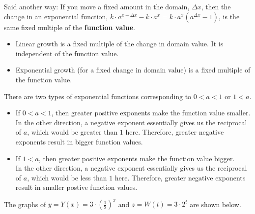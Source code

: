\documentclass{ximera}
\begin{document}
Said another way:  If you move a fixed amount in the domain, $\Delta x$, then the change in an exponential function, $k \cdot a^{x + \Delta x} - k \cdot a^x = k \cdot a^x (a^{\Delta x} - 1)$, is the same fixed multiple of the \textbf{function value}.

\begin{itemize}
\item Linear growth is a fixed multiple of the change in domain value. It is independent of the function value.
\item Exponential growth (for a fixed change in domain value) is a fixed multiple of the function value. 
\end{itemize}





There are two types of exponential functions corresponding to $0<a<1$ or $1<a$.






\begin{itemize}
\item If $0<a<1$, then greater positive exponents make the function value smaller.   \\
In the other direction, a negative exponent essentially gives us the reciprocal of $a$, which would be greater than $1$ here.  Therefore, greater negative exponents result in bigger function values. \\

\item If $1<a$, then greater positive exponents make the function value bigger.   \\ 
In the other direction, a negative exponent essentially gives us the reciprocal of $a$, which would be less than $1$ here.  Therefore, greater negative exponents result in smaller postive function values.
\end{itemize}



The graphs of $y = Y(x) = 3 \cdot \left(\frac{1}{2}\right)^x$ and $z = W(t) = 3 \cdot 2^t$ are shown below.
\end{document}
